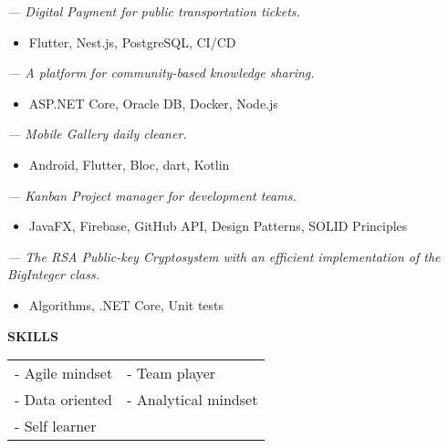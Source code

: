 

 \textit{\small— Digital Payment for public transportation tickets.}
\smallskip
\begin{itemize}
	\item Flutter, Nest.js, PostgreSQL, CI/CD
\end{itemize}

\smallskip

\smallskip
{} \textit{\small— A platform for community-based knowledge sharing.}
\smallskip
\begin{itemize}
	\item ASP.NET Core, Oracle DB, Docker, Node.js
\end{itemize}

\medskip
{} \textit{\small— Mobile Gallery daily cleaner.}
\smallskip
\begin{itemize}
	\item Android, Flutter, Bloc, dart, Kotlin
\end{itemize}

\medskip
{} \textit{\small — Kanban Project manager for development teams.}
\smallskip
\begin{itemize}
	\item JavaFX, Firebase, GitHub API, Design Patterns, SOLID Principles
\end{itemize}

\medskip
{} \textit{\small— The RSA Public-key Cryptosystem with an efficient implementation of the BigInteger class.}
\smallskip
\begin{itemize}
	\item Algorithms, .NET Core, Unit tests
\end{itemize}


\textcolor{VividPurple}{\textbf{SKILLS}}
\medskip

\begin{tabular}{ l l } 
	- Agile mindset & - Team player         \\
	- Data oriented & - Analytical mindset  \\
	- Self learner                          \\
\end{tabular}

